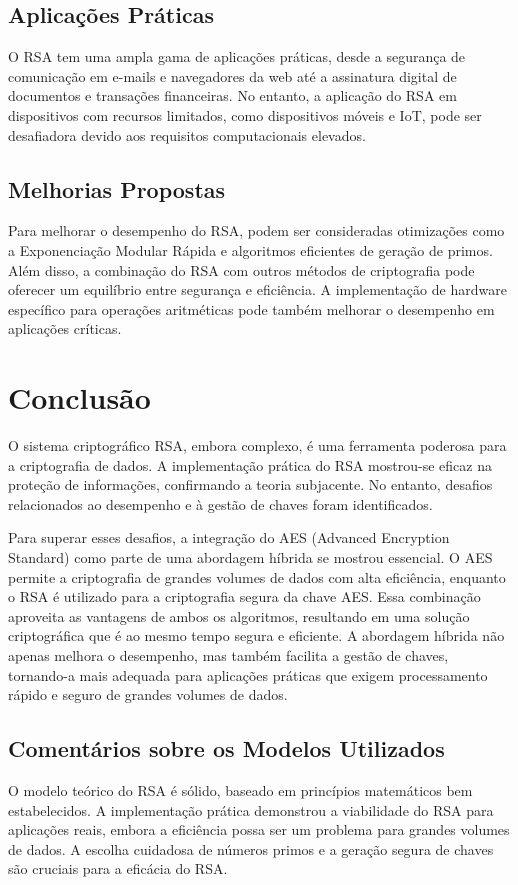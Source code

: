 \documentclass[a4paper,12pt]{article}
\begin{document}
\subsection*{Aplicações Práticas}
O RSA tem uma ampla gama de aplicações práticas, desde a segurança de comunicação em e-mails e navegadores da web até a assinatura digital de documentos e transações financeiras. No entanto, a aplicação do RSA em dispositivos com recursos limitados, como dispositivos móveis e IoT, pode ser desafiadora devido aos requisitos computacionais elevados.

\subsection*{Melhorias Propostas}
Para melhorar o desempenho do RSA, podem ser consideradas otimizações como a Exponenciação Modular Rápida e algoritmos eficientes de geração de primos. Além disso, a combinação do RSA com outros métodos de criptografia pode oferecer um equilíbrio entre segurança e eficiência. A implementação de hardware específico para operações aritméticas pode também melhorar o desempenho em aplicações críticas.

\section*{Conclusão}
O sistema criptográfico RSA, embora complexo, é uma ferramenta poderosa para a criptografia de dados. A implementação prática do RSA mostrou-se eficaz na proteção de informações, confirmando a teoria subjacente. No entanto, desafios relacionados ao desempenho e à gestão de chaves foram identificados.

Para superar esses desafios, a integração do AES (Advanced Encryption Standard) como parte de uma abordagem híbrida se mostrou essencial. O AES permite a criptografia de grandes volumes de dados com alta eficiência, enquanto o RSA é utilizado para a criptografia segura da chave AES. Essa combinação aproveita as vantagens de ambos os algoritmos, resultando em uma solução criptográfica que é ao mesmo tempo segura e eficiente. A abordagem híbrida não apenas melhora o desempenho, mas também facilita a gestão de chaves, tornando-a mais adequada para aplicações práticas que exigem processamento rápido e seguro de grandes volumes de dados.

\subsection*{Comentários sobre os Modelos Utilizados}
O modelo teórico do RSA é sólido, baseado em princípios matemáticos bem estabelecidos. A implementação prática demonstrou a viabilidade do RSA para aplicações reais, embora a eficiência possa ser um problema para grandes volumes de dados. A escolha cuidadosa de números primos e a geração segura de chaves são cruciais para a eficácia do RSA.
\end{document}
